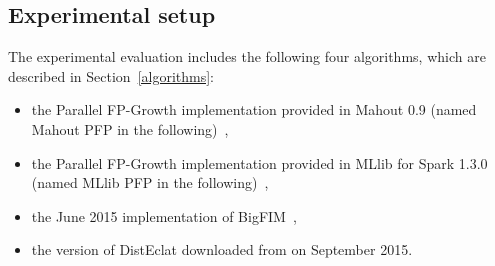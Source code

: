 
\subsection{Experimental setup}
The experimental evaluation includes the following four algorithms, 
which are described in Section~\ref{algorithms}:
\begin{itemize}
\item the Parallel FP-Growth implementation provided in Mahout 0.9 (named Mahout PFP in the following)~\cite{Mahout},
\item the Parallel FP-Growth implementation provided in MLlib for Spark 1.3.0 (named MLlib PFP in the following)~\cite{MLLib},
\item the June 2015 implementation of BigFIM~\cite{Bigfim_github},
\item the version of DistEclat downloaded from \cite{Bigfim_github} on September 2015.
\end{itemize}


